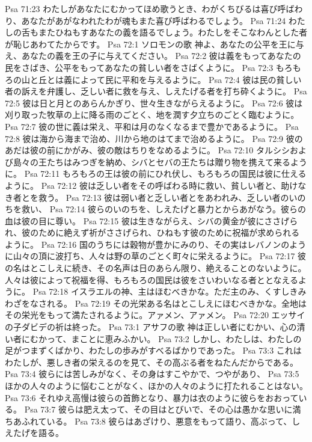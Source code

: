 Psa 71:23  わたしがあなたにむかってほめ歌うとき、わがくちびるは喜び呼ばわり、あなたがあがなわれたわが魂もまた喜び呼ばわるでしょう。
Psa 71:24  わたしの舌もまたひねもすあなたの義を語るでしょう。わたしをそこなわんとした者が恥じあわてたからです。
Psa 72:1  ソロモンの歌 神よ、あなたの公平を王に与え、あなたの義を王の子に与えてください。
Psa 72:2  彼は義をもってあなたの民をさばき、公平をもってあなたの貧しい者をさばくように。
Psa 72:3  もろもろの山と丘とは義によって民に平和を与えるように。
Psa 72:4  彼は民の貧しい者の訴えを弁護し、乏しい者に救を与え、しえたげる者を打ち砕くように。
Psa 72:5  彼は日と月とのあらんかぎり、世々生きながらえるように。
Psa 72:6  彼は刈り取った牧草の上に降る雨のごとく、地を潤す夕立ちのごとく臨むように。
Psa 72:7  彼の世に義は栄え、平和は月のなくなるまで豊かであるように。
Psa 72:8  彼は海から海まで治め、川から地のはてまで治めるように。
Psa 72:9  彼のあだは彼の前にかがみ、彼の敵はちりをなめるように。
Psa 72:10  タルシシおよび島々の王たちはみつぎを納め、シバとセバの王たちは贈り物を携えて来るように。
Psa 72:11  もろもろの王は彼の前にひれ伏し、もろもろの国民は彼に仕えるように。
Psa 72:12  彼は乏しい者をその呼ばわる時に救い、貧しい者と、助けなき者とを救う。
Psa 72:13  彼は弱い者と乏しい者とをあわれみ、乏しい者のいのちを救い、
Psa 72:14  彼らのいのちを、しえたげと暴力とからあがなう。彼らの血は彼の目に尊い。
Psa 72:15  彼は生きながらえ、シバの黄金が彼にささげられ、彼のために絶えず祈がささげられ、ひねもす彼のために祝福が求められるように。
Psa 72:16  国のうちには穀物が豊かにみのり、その実はレバノンのように山々の頂に波打ち、人々は野の草のごとく町々に栄えるように。
Psa 72:17  彼の名はとこしえに続き、その名声は日のあらん限り、絶えることのないように。人々は彼によって祝福を得、もろもろの国民は彼をさいわいなる者ととなえるように。
Psa 72:18  イスラエルの神、主はほむべきかな。ただ主のみ、くすしきみわざをなされる。
Psa 72:19  その光栄ある名はとこしえにほむべきかな。全地はその栄光をもって満たされるように。アァメン、アァメン。
Psa 72:20  エッサイの子ダビデの祈は終った。
Psa 73:1  アサフの歌 神は正しい者にむかい、心の清い者にむかって、まことに恵みふかい。
Psa 73:2  しかし、わたしは、わたしの足がつまずくばかり、わたしの歩みがすべるばかりであった。
Psa 73:3  これはわたしが、悪しき者の栄えるのを見て、その高ぶる者をねたんだからである。
Psa 73:4  彼らには苦しみがなく、その身はすこやかで、つやがあり、
Psa 73:5  ほかの人々のように悩むことがなく、ほかの人々のように打たれることはない。
Psa 73:6  それゆえ高慢は彼らの首飾となり、暴力は衣のように彼らをおおっている。
Psa 73:7  彼らは肥え太って、その目はとびいで、その心は愚かな思いに満ちあふれている。
Psa 73:8  彼らはあざけり、悪意をもって語り、高ぶって、しえたげを語る。
